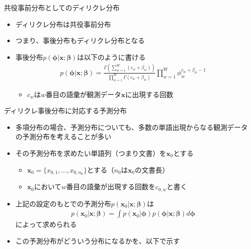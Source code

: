 \documentclass[aspectratio=169,unicode,dvipdfmx,14pt]{beamer}
\begin{document}
\begin{frame}{共役事前分布としてのディリクレ分布}
\begin{itemize}
\item ディリクレ分布は共役事前分布
\item つまり、事後分布もディリクレ分布となる
\item 事後分布$p(\bm{\phi}|\bm{x}; \bm{\beta})$は以下のように書ける
\begin{align}
p(\bm{\phi}|\bm{x}; \bm{\beta}) = 
\frac{\Gamma(\sum_{w=1}^W (c_w + \beta_w))}{\prod_{w=1}^W \Gamma(c_w + \beta_w)}
\prod_{w=1}^W \phi_w^{c_w + \beta_w - 1}
\end{align}
\begin{itemize}
\item $c_w$は$w$番目の語彙が観測データ$\bm{x}$に出現する回数
\end{itemize}
\end{itemize}
\end{frame}

\begin{frame}{ディリクレ事後分布に対応する予測分布}
\begin{itemize}
\item 多項分布の場合、予測分布についても、多数の単語出現からなる観測データの予測分布を考えることが多い
\item その予測分布を求めたい単語列（つまり文書）を$\bm{x}_0$とする
\begin{itemize}
\item $\bm{x}_0 = \{x_{0,1}, \ldots, x_{0,n_0}\}$とする（$n_0$は$\bm{x}_0$の文書長）
\item $\bm{x}_0$において$w$番目の語彙が出現する回数を$c_{0,w}$と書く
\end{itemize}
\item 上記の設定のもとでの予測分布$p(\bm{x}_0 | \bm{x};\bm{\beta})$は
\begin{align}
p(\bm{x}_0|\bm{x};\bm{\beta}) = \int p(\bm{x}_0|\bm{\phi})p(\bm{\phi}|\bm{x};\bm{\beta}) d\bm{\phi}
\label{eq:DirMulti_pred}
\end{align}
によって求められる
\item この予測分布がどういう分布になるかを、以下で示す
\end{itemize}
\end{frame}
\end{document}
